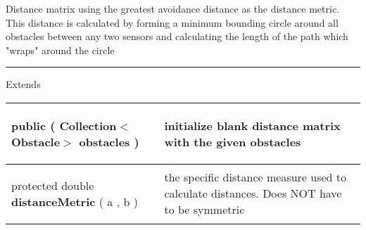  {\scriptsize Distance matrix using the greatest avoidance distance as the distance metric. This distance is calculated by forming a minimum bounding circle around all obstacles\newline%
 between any two sensors and calculating the length of the path which "wraps" around the circle
 
\vspace*{4pt} \hrule \vspace*{3pt}
Extends \textbf{ \hyperref[tab:DistanceMatrix]{\color{blue}{DistanceMatrix}} }
\vspace*{-5pt} 
\begin{tabularx}{\linewidth}{m{}|m{}}
\label{tab:GreatestAvoidanceDistanceMatrix}
\begin{raggedleft}public  \textbf{\hyperref[tab:GreatestAvoidanceDistanceMatrix]{\color{blue}{GreatestAvoidanceDistanceMatrix}} }(\hspace*{ 5pt} \textbf{Collection$<$Obstacle$>$} obstacles  )
\end{raggedleft} &
 initialize blank distance matrix with the given obstacles\\ \hline 
\begin{raggedleft}protected double \textbf{distanceMetric }(\newline \hfill 
\hspace*{ 5pt} \textbf{\hyperref[tab:Sensor]{\color{blue}{Sensor}}} a , \newline
 \hspace*{ 5pt} \textbf{\hyperref[tab:Sensor]{\color{blue}{Sensor}}} b  )
\end{raggedleft} &
 the specific distance measure used to calculate distances. Does NOT have to be symmetric\\\end{tabularx}
}
